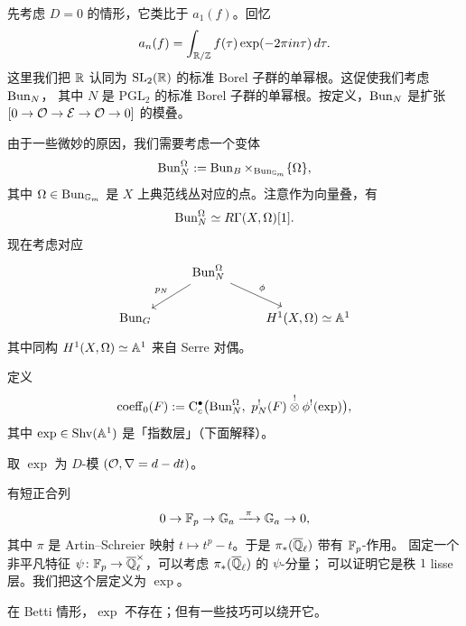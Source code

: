 先考虑 \(D=0\) 的情形，它类比于 \(a_1(f)\)。回忆
\[
a_n(f)=\int_{\mathbb{R}/\mathbb{Z}}f(\tau)\exp(-2\pi i n\tau)\,d\tau.
\]
这里我们把 \(\mathbb{R}\) 认同为 \(\mathrm{SL}_2(\mathbb{R})\) 的标准 Borel 子群的单幂根。这促使我们考虑 \(\operatorname{Bun}_N\)，
其中 \(N\) 是 \(\mathrm{PGL}_2\) 的标准 Borel 子群的单幂根。按定义，\(\operatorname{Bun}_N\) 是扩张
\([0\to\mathcal{O}\to\mathcal{E}\to\mathcal{O}\to 0]\) 的模叠。

由于一些微妙的原因，我们需要考虑一个变体
\[
\operatorname{Bun}^\Omega_N:=\operatorname{Bun}_B\times_{\operatorname{Bun}_{\mathbb{G}_m}}\{\Omega\},
\]
其中 \(\Omega\in\operatorname{Bun}_{\mathbb{G}_m}\) 是 \(X\) 上典范线丛对应的点。注意作为向量叠，有
\[
\operatorname{Bun}^\Omega_N\simeq R\Gamma(X,\Omega)[1].
\]
现在考虑对应
\[
\begin{tikzcd}
& \Bun^\Omega_N \arrow[dl,"p_N"'] \arrow[dr,"\phi"] & \\
\Bun_G & & H^1(X,\Omega)\simeq\A^1
\end{tikzcd}
\]
其中同构 \(H^1(X,\Omega)\simeq\mathbb{A}^1\) 来自 Serre 对偶。

\begin{definition}\label{def:coeff0}
定义
\[
\coeff_0(F):=\mathrm{C}^\bullet_c\bigl(\Bun^\Omega_N,\ p_N^!(F)\overset{!}{\otimes}\phi^!(\exp)\bigr),
\]
其中 \(\exp\in\operatorname{Shv}(\mathbb{A}^1)\) 是「指数层」（下面解释）。
\end{definition}

\begin{example}[de Rham 情形]\label{ex:exp-dr}
取 \(\exp\) 为 \(D\)-模 \((\mathcal{O},\nabla=d-dt)\)。
\end{example}

\begin{example}\label{ex:exp-et}
有短正合列
\[
0\to\mathbb{F}_p\to\mathbb{G}_a\xrightarrow{\ \pi\ }\mathbb{G}_a\to 0,
\]
其中 \(\pi\) 是 Artin--Schreier 映射 \(t\mapsto t^p-t\)。于是 \(\pi_*(\overline{\mathbb{Q}}_{\ell})\) 带有 \(\mathbb{F}_p\)-作用。
固定一个非平凡特征 \(\psi\colon\mathbb{F}_p\to\overline{\mathbb{Q}}_{\ell}^\times\)，可以考虑 \(\pi_*(\overline{\mathbb{Q}}_{\ell})\) 的 \(\psi\)-分量；
可以证明它是秩 \(1\) lisse 层。我们把这个层定义为 \(\exp\)。
\end{example}

\begin{remark}[Betti 情形]\label{rem:exp-betti}
在 Betti 情形，\(\exp\) 不存在；但有一些技巧可以绕开它。
\end{remark}
